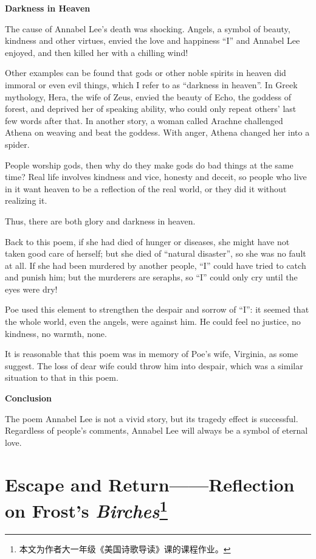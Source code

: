 \par \textbf{Darkness in Heaven}
\par The cause of Annabel Lee's death was shocking. Angels, a symbol of beauty, kindness and other virtues, envied the love and happiness ``I'' and Annabel Lee enjoyed, and then killed her with a chilling wind! 
\par Other examples can be found that gods or other noble spirits in heaven did immoral or even evil things, which I refer to as ``darkness in heaven''. In Greek mythology, Hera, the wife of Zeus, envied the beauty of Echo, the goddess of forest, and deprived her of speaking ability, who could only repeat others' last few words after that. In another story, a woman called Arachne challenged Athena on weaving and beat the goddess. With anger, Athena changed her into a spider.
\par People worship gods, then why do they make gods do bad things at the same time? Real life involves kindness and vice, honesty and deceit, so people who live in it want heaven to be a reflection of the real world, or they did it without realizing it.
\par Thus, there are both glory and darkness in heaven.
\par Back to this poem, if she had died of hunger or diseases, she might have not taken good care of herself; but she died of ``natural disaster'', so she was no fault at all. If she had been murdered by another people, ``I'' could have tried to catch and punish him; but the murderers are seraphs, so ``I'' could only cry until the eyes were dry! 
\par Poe used this element to strengthen the despair and sorrow of ``I'': it seemed that the whole world, even the angels, were against him. He could feel no justice, no kindness, no warmth, none.
\par It is reasonable that this poem was in memory of Poe's wife, Virginia, as some suggest. The loss of dear wife could throw him into despair, which was a similar situation to that in this poem.
\par \textbf{Conclusion}
\par The poem Annabel Lee is not a vivid story, but its tragedy effect is successful. Regardless of people's comments, Annabel Lee will always be a symbol of eternal love.
\par {}

\section*{Escape and Return——Reflection on Frost’s \emph{Birches}\footnote{本文为作者大一年级《美国诗歌导读》课的课程作业。}}

